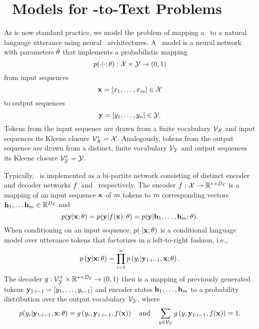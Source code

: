 \section{\SequencetoSequence~Models for \MeaningRepresentation-to-Text Problems}
\label{mrtproblemdef}

As is now standard practice, we model the problem of mapping a \meaningrepresentation~to
a natural language utterance using  neural \sequencetosequence~architectures. 
A \sequencetosequence~model is a neural network with parameters $\theta$
that implements a probabilistic mapping
\[ p(\cdot|\cdot;\theta) : \mathcal{X} \times \mathcal{Y} \rightarrow
(0,1)\] from input sequences \[\mathbf{x} = \left[x_1,\ldots,x_{m}\right] \in \mathcal{X}\]
to output sequences \[\mathbf{y} = \left[y_1, \ldots, y_n\right] \in \mathcal{Y}.\]
Tokens from the input sequence are drawn from a finite vocabulary $\mathcal{V}_{\mathcal{X}}$ and input sequences its
Kleene closure $\mathcal{V}_{\mathcal{X}}^* = \mathcal{X}$. 
Analogously, tokens from the output sequence are drawn from a distinct, finite vocabulary $\mathcal{V}_{\mathcal{Y}}$ and output sequences its
Kleene closure $\mathcal{V}_{\mathcal{Y}}^* = \mathcal{Y}$. 

Typically, \gen~is implemented as a bi-partite network consisting of distinct
encoder and decoder networks $f$~and \decMod~respectively. The encoder $f : \mathcal{X} \rightarrow \mathbb{R}^{*\times{D_\mathcal{E}}}$ is a mapping of an input sequence $\mathbf{x}$ of $m$ tokens to
$m$ corresponding  vectors $\mathbf{h}_1,\ldots\mathbf{h}_{m} \in \mathbb{R}^{{D_\mathcal{E}}}$ and
\[ p(\mathbf{y}|\mathbf{x};\theta) = p(\mathbf{y}|f(\mathbf{x}); \theta) = p(\mathbf{y}|\mathbf{h}_1,\ldots,\mathbf{h}_{m};\theta).\]
When conditioning on an input sequence, $p(\cdot|\mathbf{x};\theta)$ is a conditional
language model over utterance tokens that factorizes in a left-to-right fashion, i.e.,
\[p\left( \mathbf{y}| \mathbf{x};\theta \right) = \prod_{i=1}^n p\left(y_i|\mathbf{y}_{1:i-1},\mathbf{x};\theta\right). \]
The decoder $g : \mathcal{V}_{\mathcal{Y}}^+ \times \mathbb{R}^{*\times {D_\mathcal{E}}} \rightarrow (0,1)$ then is 
a mapping of previously generated tokens $\mathbf{y}_{1:i-1} = \left[y_1,\ldots,y_{i-1}\right]$ and encoder states $\mathbf{h}_1,\ldots,\mathbf{h}_{m}$ to a probability distribution over
the output vocabulary $\mathcal{V}_{\mathcal{Y}}$, where
\[ p(y_i|\mathbf{y}_{1:i-1},\mathbf{x};\theta) = g\left(y_i, \mathbf{y}_{1:i-1}, f(\mathbf{x})\right)   \quad \textrm{and} \quad \sum_{y\in \mathcal{V}_{\mathcal{Y}}} g\left(y, \mathbf{y}_{1:i-1}, f(\mathbf{x})\right) = 1.  \]


